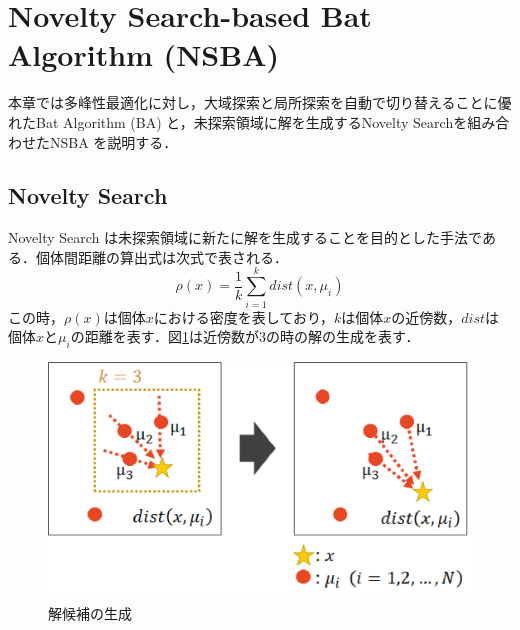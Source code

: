 \documentclass[a4j,11pt]{jarticle}
\def\proposed{DNRBA}
\begin{document}

\clearpage
\newpage
\section{Novelty Search-based Bat Algorithm (NSBA)}
\label{sec:NSBA}
本章では多峰性最適化に対し，大域探索と局所探索を自動で切り替えることに優れたBat Algorithm (BA) と，未探索領域に解を生成するNovelty Searchを組み合わせたNSBA \cite{NSBA} を説明する．

\subsection{Novelty Search}
\label{ss:NS}
Novelty Search \cite{NS} は未探索領域に新たに解を生成することを目的とした手法である．個体間距離の算出式は次式で表される．
\begin{equation}
\label{eq:ns}
\rho(x)=\frac{1}{k}\sum_{i=1}^k dist(x,\mu_i)
\end{equation}
この時，$\rho(x)$は個体$x$における密度を表しており，$kは$個体$x$の近傍数，$dist$は個体$x$と$\mu_i$の距離を表す．図\ref{fig:ns}は近傍数が3の時の解の生成を表す．
\begin{figure}[h]
  \centering
  \includegraphics[width=0.8\linewidth]{eps/IES2018/ns.eps}
  \caption{解候補の生成}
  \label{fig:ns}
\end{figure}
\end{document}
